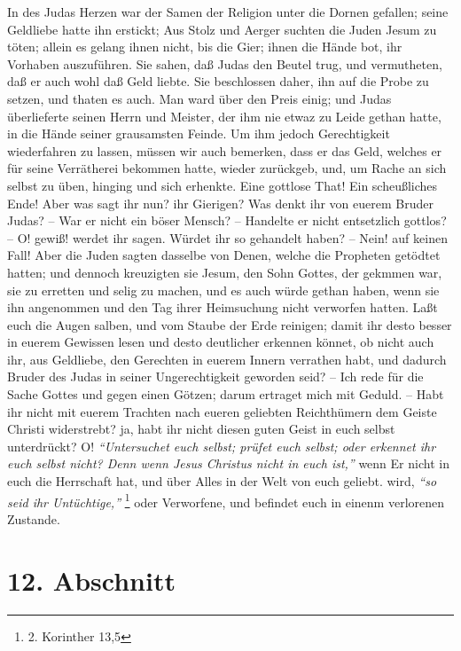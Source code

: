 In des Judas Herzen war der Samen der Religion unter die Dornen gefallen; seine
Geldliebe hatte ihn erstickt; Aus Stolz und Aerger suchten die Juden Jesum zu
töten; allein es gelang ihnen nicht, bis die Gier; ihnen die Hände bot, ihr
Vorhaben auszuführen. Sie sahen, daß Judas den Beutel trug, und vermutheten, daß
er auch wohl daß Geld liebte. Sie beschlossen daher, ihn auf die Probe zu
setzen, und thaten es auch. Man ward über den Preis einig; und Judas
überlieferte seinen Herrn und Meister, der ihm nie etwaz zu Leide gethan hatte,
in die Hände seiner grausamsten Feinde. Um ihm jedoch Gerechtigkeit wiederfahren
zu lassen, müssen wir auch bemerken, dass er das Geld, welches er für seine
Verrätherei bekommen hatte, wieder zurückgeb, und, um Rache an sich selbst zu
üben, hinging und sich erhenkte. Eine gottlose That! Ein scheußliches Ende! Aber
was sagt ihr nun? ihr Gierigen? Was denkt ihr von euerem Bruder Judas? -- War er
nicht ein böser Mensch? -- Handelte er nicht entsetzlich gottlos? -- O! gewiß!
werdet ihr sagen. Würdet ihr so gehandelt haben? -- Nein! auf keinen Fall! Aber
die Juden sagten dasselbe von Denen, welche die Propheten getödtet hatten; und
dennoch kreuzigten sie Jesum, den Sohn Gottes, der gekmmen war, sie zu erretten
und selig zu machen, und es auch würde gethan haben, wenn sie ihn angenommen und
den Tag ihrer Heimsuchung nicht verworfen hatten. Laßt euch die Augen salben,
und vom Staube der Erde reinigen; damit ihr desto besser in euerem Gewissen
lesen und desto deutlicher erkennen könnet, ob nicht auch ihr, aus Geldliebe,
den Gerechten in euerem Innern verrathen habt, und dadurch Bruder des Judas in
seiner Ungerechtigkeit geworden seid? -- Ich rede für die Sache Gottes und gegen
einen Götzen; darum ertraget mich mit Geduld. -- Habt ihr nicht mit euerem
Trachten nach eueren geliebten Reichthümern dem Geiste Christi widerstrebt? ja,
habt ihr nicht diesen guten Geist in euch selbst unterdrückt? O! \textit{"`Untersuchet
euch selbst; prüfet euch selbst; oder erkennet ihr euch selbst nicht? Denn wenn
Jesus Christus nicht in euch ist,"'}
wenn Er nicht in euch die Herrschaft hat,
und über Alles in der Welt von euch geliebt. wird, \textit{"`so seid ihr
Untüchtige,"'}
\footnote{2. Korinther 13,5}
oder Verworfene, und befindet euch in einenm
verlorenen Zustande.

\section{12. Abschnitt} \label{kap13_ab12}

